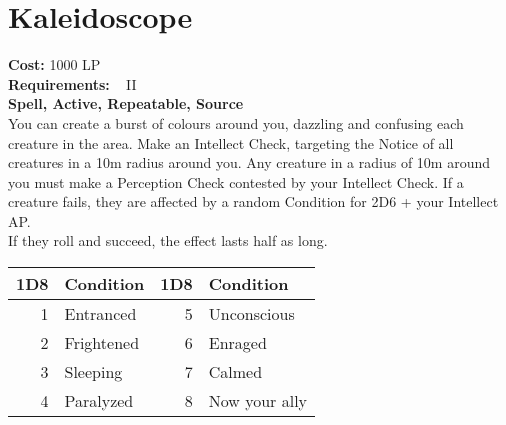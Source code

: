 \section{Kaleidoscope}\label{spell:kaleidoscope}
\textbf{Cost:} 1000 LP\\
\textbf{Requirements:} ~ II\\
\textbf{Spell, Active, Repeatable, Source}\\
You can create a burst of colours around you, dazzling and confusing each creature in the area.
Make an Intellect Check, targeting the Notice of all creatures in a 10m radius around you.
Any creature in a radius of 10m around you must make a Perception Check contested by your Intellect Check.
If a creature fails, they are affected by a random Condition for 2D6 + your Intellect AP.\\
If they roll and succeed, the effect lasts half as long.\\

\begin{tabular}{r | l || r | l}
    1D8 & Condition & 1D8 & Condition\\
    \hline
    1 & Entranced & 5 & Unconscious \\
    2 & Frightened & 6 & Enraged \\
    3 & Sleeping & 7 & Calmed\\
    4 & Paralyzed & 8 & Now your ally \\
\end{tabular}